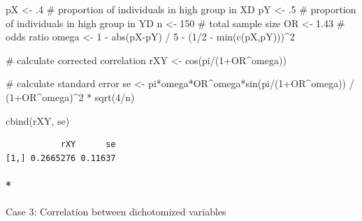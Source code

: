 \documentclass[
  letterpaper,
  DIV=11,
  numbers=noendperiod]{scrreprt}
\let\oldparagraph\paragraph
\renewcommand{\paragraph}[1]{\oldparagraph{#1}\mbox{}}
\newenvironment{Shaded}{}{}
\newcommand{\CommentTok}[1]{\textcolor[rgb]{0.54,0.53,0.53}{#1}}
\newcommand{\DecValTok}[1]{\textcolor[rgb]{0.69,0.50,0.00}{#1}}
\newcommand{\FloatTok}[1]{\textcolor[rgb]{0.69,0.50,0.00}{#1}}
\newcommand{\FunctionTok}[1]{\textcolor[rgb]{0.39,0.29,0.61}{#1}}
\newcommand{\NormalTok}[1]{\textcolor[rgb]{0.12,0.11,0.11}{#1}}
\newcommand{\OtherTok}[1]{\textcolor[rgb]{0.00,0.43,0.16}{#1}}
\newcommand{\SpecialCharTok}[1]{\textcolor[rgb]{0.24,0.68,0.91}{#1}}
\begin{document}
\begin{Shaded}
\begin{Highlighting}[]
\NormalTok{pX }\OtherTok{\textless{}{-}}\NormalTok{ .}\DecValTok{4} \CommentTok{\# proportion of individuals in high group in XD}
\NormalTok{pY }\OtherTok{\textless{}{-}}\NormalTok{ .}\DecValTok{5} \CommentTok{\# proportion of individuals in high group in YD}
\NormalTok{n }\OtherTok{\textless{}{-}} \DecValTok{150} \CommentTok{\# total sample size}
\NormalTok{OR }\OtherTok{\textless{}{-}} \FloatTok{1.43} \CommentTok{\# odds ratio}
\NormalTok{omega }\OtherTok{\textless{}{-}} \DecValTok{1} \SpecialCharTok{{-}} \FunctionTok{abs}\NormalTok{(pX}\SpecialCharTok{{-}}\NormalTok{pY) }\SpecialCharTok{/} \DecValTok{5} \SpecialCharTok{{-}}\NormalTok{ (}\DecValTok{1}\SpecialCharTok{/}\DecValTok{2} \SpecialCharTok{{-}} \FunctionTok{min}\NormalTok{(}\FunctionTok{c}\NormalTok{(pX,pY)))}\SpecialCharTok{\^{}}\DecValTok{2}

\CommentTok{\# calculate corrected correlation}
\NormalTok{rXY }\OtherTok{\textless{}{-}} \FunctionTok{cos}\NormalTok{(pi}\SpecialCharTok{/}\NormalTok{(}\DecValTok{1}\SpecialCharTok{+}\NormalTok{OR}\SpecialCharTok{\^{}}\NormalTok{omega))}

\CommentTok{\# calculate standard error}
\NormalTok{se }\OtherTok{\textless{}{-}}\NormalTok{ pi}\SpecialCharTok{*}\NormalTok{omega}\SpecialCharTok{*}\NormalTok{OR}\SpecialCharTok{\^{}}\NormalTok{omega}\SpecialCharTok{*}\FunctionTok{sin}\NormalTok{(pi}\SpecialCharTok{/}\NormalTok{(}\DecValTok{1}\SpecialCharTok{+}\NormalTok{OR}\SpecialCharTok{\^{}}\NormalTok{omega)) }\SpecialCharTok{/}\NormalTok{ (}\DecValTok{1}\SpecialCharTok{+}\NormalTok{OR}\SpecialCharTok{\^{}}\NormalTok{omega)}\SpecialCharTok{\^{}}\DecValTok{2} \SpecialCharTok{*} \FunctionTok{sqrt}\NormalTok{(}\DecValTok{4}\SpecialCharTok{/}\NormalTok{n)}

\FunctionTok{cbind}\NormalTok{(rXY, se)}
\end{Highlighting}
\end{Shaded}

\begin{verbatim}
           rXY      se
[1,] 0.2665276 0.11637
\end{verbatim}

\paragraph*{Case 3: Correlation between dichotomized
variables}\label{case-3-correlation-between-dichotomized-variables}
\end{document}
